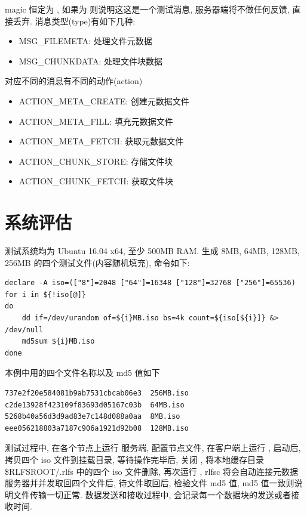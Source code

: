 magic 恒定为 , 如果为  则说明这这是一个测试消息, 服务器端将不做任何反馈,
直接丢弃. 消息类型(type)有如下几种:

\begin{itemize}
    \item MSG\_FILEMETA: 处理文件元数据
    \item MSG\_CHUNKDATA: 处理文件块数据
\end{itemize}

对应不同的消息有不同的动作(action)

\begin{itemize}
    \item ACTION\_META\_CREATE: 创建元数据文件
    \item ACTION\_META\_FILL: 填充元数据文件
    \item ACTION\_META\_FETCH: 获取元数据文件
    \item ACTION\_CHUNK\_STORE: 存储文件块
    \item ACTION\_CHUNK\_FETCH: 获取文件块
\end{itemize}

\section{系统评估}
测试系统均为 Ubuntu 16.04 x64, 至少 500MB RAM.
生成 8MB, 64MB, 128MB, 256MB 的四个测试文件(内容随机填充), 命令如下:

\begin{lstlisting}[style=verb]
declare -A iso=(["8"]=2048 ["64"]=16348 ["128"]=32768 ["256"]=65536)
for i in ${!iso[@]}
do
    dd if=/dev/urandom of=${i}MB.iso bs=4k count=${iso[${i}]} &> /dev/null
    md5sum ${i}MB.iso
done
\end{lstlisting}

本例中用的四个文件名称以及 md5 值如下
\begin{lstlisting}[style=verb]
737e2f20e584081b9ab7531cbcab06e3  256MB.iso
c2de13928f423109f83693d05167c03b  64MB.iso
5268b40a56d3d9ad83e7c148d088a0aa  8MB.iso
eee056218803a7187c906a1921d92b08  128MB.iso
\end{lstlisting}

测试过程中, 在各个节点上运行  服务端, 配置节点文件,
在客户端上运行 , 启动后, 拷贝四个 iso 文件到挂载目录, 等待操作完毕后,
关闭 , 将本地缓存目录 \$RLFSROOT/.rlfs 中的四个 iso 文件删除,
再次运行 , rlfsc 将会自动连接元数据服务器并并发取回四个文件后, 待文件取回后,
检验文件 md5 值, md5 值一致则说明文件传输一切正常. 数据发送和接收过程中,
会记录每一个数据块的发送或者接收时间.

